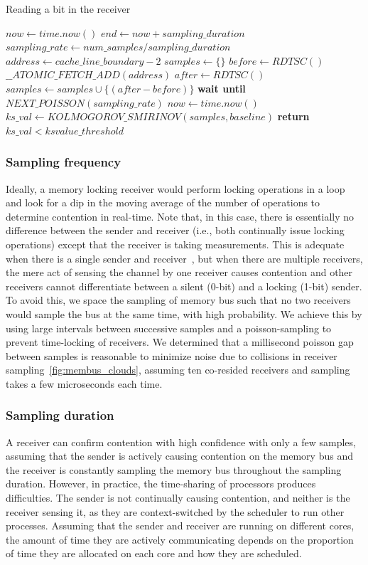 \begin{algorithm}[!t]
\caption{Reading a bit in the receiver}
\label{alg:receiver}
\begin{algorithmic}[1]
\STATE $now \leftarrow  time.now()$
\STATE $end \leftarrow now + sampling\_duration$
\STATE $sampling\_rate \leftarrow num\_samples / sampling\_duration$
\STATE $address \leftarrow cache\_line\_boundary-2$
\STATE $samples \leftarrow \{\} $
    \STATE $before \leftarrow RDTSC()$
    \STATE $\_\_ATOMIC\_FETCH\_ADD(address)$
    \STATE $after \leftarrow RDTSC()$
    \STATE $samples \leftarrow samples \cup \{(after-before)\}$
    \STATE \textbf{wait until} $NEXT\_POISSON(sampling\_rate)$
    \STATE $now \leftarrow  time.now()$
\ENDWHILE
\STATE $ks\_val \leftarrow KOLMOGOROV\_SMIRINOV(samples, baseline)$
\STATE \textbf{return} $ks\_val < ksvalue\_threshold$
\end{algorithmic}
\end{algorithm}


\subsubsection{Sampling frequency}
Ideally, a memory locking receiver would perform locking operations in a loop
and look for a dip in the moving average of the number of operations to
determine contention in real-time. Note that, in this case, there is essentially
no difference between the sender and receiver (i.e., both continually issue
locking operations) except that the receiver is taking measurements. This is
adequate when there is a single sender and receiver~\cite{varadarajan2015}, but
when there are multiple receivers, the mere act of sensing the channel by one
receiver causes contention and other receivers cannot differentiate between a
silent (0-bit) and a locking (1-bit) sender. To avoid this, we space the
sampling of memory bus such that no two receivers would sample the bus at the
same time, with high probability.  We achieve this by using large intervals
between successive samples and a poisson-sampling to prevent time-locking of
receivers. We determined that a millisecond poisson gap between samples is
reasonable to minimize noise due to collisions in receiver
sampling~\ref{fig:membus_clouds}, assuming ten co-resided receivers and sampling
takes a few microseconds each time.

\subsubsection{Sampling duration}
\label{sec:method:samplingdur}
A receiver can confirm contention with high confidence with only a few samples,
assuming that the sender is actively causing contention on the memory bus and
the receiver is constantly sampling the memory bus throughout the sampling
duration.  However, in practice, the time-sharing of processors produces
difficulties.  The sender is not continually causing contention, and neither is
the receiver sensing it, as they are context-switched by the scheduler to run
other processes.  Assuming that the sender and receiver are running on different
cores, the amount of time they are actively communicating depends on the
proportion of time they are allocated on each core and how they are scheduled. 

